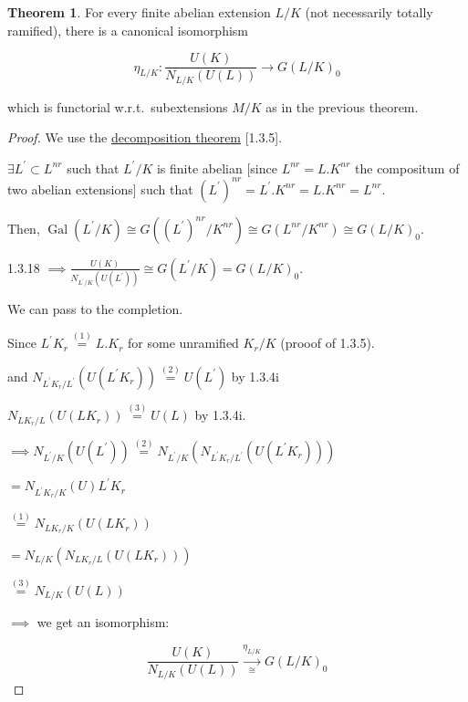 \documentclass{article}
\theoremstyle{definition}
\newtheorem{theorem}{Theorem}
\numberwithin{theorem}{subsection}
\begin{document}
    \begin{theorem}
        For every finite abelian extension \(L / K\) (not necessarily totally ramified), there is a canonical isomorphism

        \[
            \eta_{L / K} : \frac{U(K)}{N_{L / K}(U(L))} \to G(L / K)_0
        \]

        which is functorial w.r.t.\ subextensions \(M / K\) as in the previous theorem.
    \end{theorem}

    \begin{proof}
        We use the \underline{decomposition theorem} [1.3.5].
        
        \(\exists L^{\prime} \subset L^{nr}\) such that \(L^{\prime} / K\) is finite abelian [since \(L^{nr} = L . K^{nr}\) the compositum of two abelian extensions] such that \((L^{\prime})^{nr} = L^{\prime} . K^{nr} = L . K^{nr} = L^{nr} \).

        Then, \(\operatorname{Gal} (L^{\prime} / K) \cong G((L^{\prime})^{nr} / K^{nr}) \cong G(L^{nr} / K^{nr}) \cong G(L / K)_0\).
        
        1.3.18 \(\implies \frac{U(K)}{N_{L^{\prime} / K}(U(L^{\prime}))} \cong G(L^{\prime} / K) = G(L / K)_0\).
        
        We can pass to the completion.

        Since \(L^{\prime} K_r \overset{(1)}{=} L.K_r\) for some unramified \(K_r / K\) (prooof  of 1.3.5).

        and \(N_{L^{\prime} K_r / L^{\prime}}(U(L^{\prime}K_r)) \overset{(2)}{=}  U(L^{\prime})\) by 1.3.4i
        
        \(N_{LK_r / L}(U(LK_r)) \overset{(3)}{=} U(L)\) by 1.3.4i.

        \(\implies N_{L^{\prime} / K}(U(L^{\prime})) \overset{(2)}{=} N_{L^{\prime} / K}(N_{L^{\prime} K_r / L^{\prime}}(U(L^{\prime} K_r)))\)


        \(= N_{L^{\prime} K_r / K}(U)L^{\prime} K_r\)
        
        \(\overset{(1)}{=} N_{LK_r / K}(U(LK_r))\)

        \(= N_{L / K}(N_{L K_r / L}(U(LK_r)))\) 

        \(\overset{(3)}{=} N_{L / K}(U(L))\) 
        
        \(\implies\) we get an isomorphism:


        \[
            \frac{U(K)}{N_{L / K}(U(L))} \xrightarrow[\cong]{\eta_{L / K}} G(L / K)_0
        \]

    \end{proof}
\end{document}
